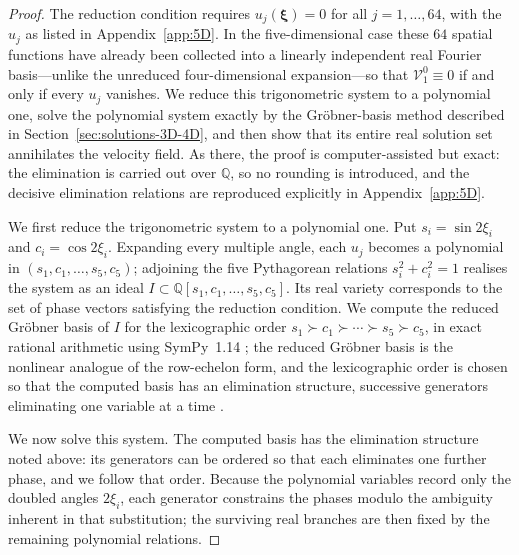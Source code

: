 \documentclass[11pt]{jfm}
\numberwithin{equation}{section}
\begin{document}
\begin{proof}
The reduction condition requires $u_j(\boldsymbol{\xi})=0$ for all $j=1,\ldots,64$, with the
$u_j$ as listed in Appendix~\ref{app:5D}. In the five-dimensional case these $64$ spatial functions
have already been collected into a linearly independent real Fourier basis---unlike the unreduced
four-dimensional expansion---so that $\mathcal{V}_1^0\equiv0$ if and only if every $u_j$ vanishes. We reduce this trigonometric system to a polynomial
one, solve the polynomial system exactly by the Gr\"obner-basis method described in
Section~\ref{sec:solutions-3D-4D}, and then show that its entire real solution set annihilates the
velocity field. As there, the proof is computer-assisted but exact: the elimination is carried out over
$\mathbb{Q}$, so no rounding is introduced, and the decisive elimination relations are reproduced
explicitly in Appendix~\ref{app:5D}.

We first reduce the trigonometric system to a polynomial one. Put $s_i=\sin 2\xi_i$ and $c_i=\cos 2\xi_i$. Expanding
every multiple angle, each $u_j$ becomes a polynomial in $(s_1,c_1,\ldots,s_5,c_5)$; adjoining
the five Pythagorean relations $s_i^2+c_i^2=1$ realises the system as an ideal
$I\subset\mathbb{Q}[s_1,c_1,\ldots,s_5,c_5]$. Its real variety corresponds to the set of phase
vectors satisfying the reduction condition. We compute the reduced Gr\"obner basis of $I$ for the
lexicographic order $s_1\succ c_1\succ\cdots\succ s_5\succ c_5$, in exact rational arithmetic
using SymPy~1.14 \citep{sympy2017}; the reduced Gr\"obner basis is the nonlinear analogue of the
row-echelon form, and the lexicographic order is chosen so that the computed basis has an
elimination structure, successive generators eliminating one variable at a time \citep{cox2015ideals}.

We now solve this system. The computed basis has the elimination structure noted above: its
generators can be ordered so that each eliminates one further phase, and we follow that order.
Because the polynomial variables record only the doubled angles $2\xi_i$, each generator constrains the phases modulo the ambiguity inherent in that substitution; the surviving real branches are then fixed by the remaining polynomial relations.


\end{proof}
\end{document}
